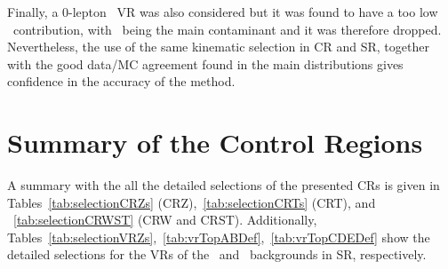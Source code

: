 		Finally, a $0$-lepton \ttgamma\ \ac{VR} was also considered but it was found to have a too low \ttgamma\ contribution, with \gammajets\ being the main contaminant and it was therefore dropped. Nevertheless, the use of the same kinematic selection in \ac{CR}  and \ac{SR}, together with the good data/MC agreement found in the main distributions gives confidence in the accuracy of the method.




	\clearpage\section{Summary of the Control Regions}

		A summary with the all the detailed selections of the presented \acp{CR} is given in Tables~\ref{tab:selectionCRZs} (CRZ),~\ref{tab:selectionCRTs} (CRT), and ~\ref{tab:selectionCRWST} (CRW and CRST). Additionally, Tables~\ref{tab:selectionVRZs},~\ref{tab:vrTopABDef},~\ref{tab:vrTopCDEDef} show the detailed selections for the \acp{VR} of the \Zjets\ and \ttbar\ backgrounds in \ac{SR}, respectively.

